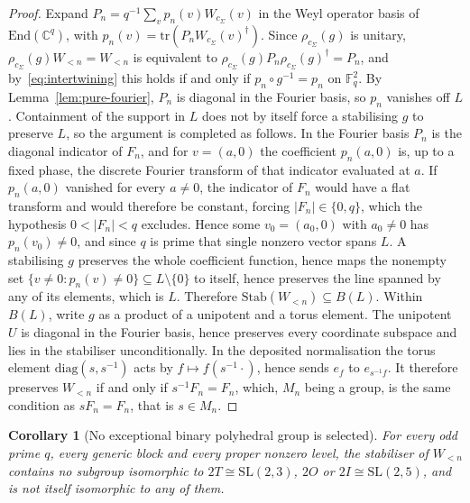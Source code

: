 \documentclass[11pt,a4paper]{article}
\newtheorem{corollary}[theorem]{Corollary}
\newcommand{\SL}{\mathrm{SL}}
\begin{document}
    \begin{proof}
      Expand $P_{n} = q^{-1} \sum_{v} p_{n}(v) W_{c_{\Sigma}}(v)$ in the Weyl operator basis of
      $\mathrm{End}(\mathbb{C}^{q})$, with
      $p_{n}(v) = \mathrm{tr}(P_{n} W_{c_{\Sigma}}(v)^{\dagger})$.
      Since $\rho_{c_{\Sigma}}(g)$ is unitary, $\rho_{c_{\Sigma}}(g) W_{<n} = W_{<n}$ is
      equivalent to
      $\rho_{c_{\Sigma}}(g) P_{n} \rho_{c_{\Sigma}}(g)^{\dagger} = P_{n}$, and
      by~\eqref{eq:intertwining} this holds if and only if $p_{n} \circ g^{-1} = p_{n}$ on
      $\mathbb{F}_{q}^{2}$.
      By Lemma~\ref{lem:pure-fourier}, $P_{n}$ is diagonal in the Fourier basis, so $p_{n}$
      vanishes off $L$.
      Containment of the support in $L$ does not by itself force a stabilising $g$ to preserve
      $L$, so the argument is completed as follows.
      In the Fourier basis $P_{n}$ is the diagonal indicator of $F_{n}$, and for $v = (a,0)$ the
      coefficient $p_{n}(a,0)$ is, up to a fixed phase, the discrete Fourier transform of that
      indicator evaluated at $a$.
      If $p_{n}(a,0)$ vanished for every $a \neq 0$, the indicator of $F_{n}$ would have a flat
      transform and would therefore be constant, forcing $|F_{n}| \in \{0, q\}$, which the
      hypothesis $0 < |F_{n}| < q$ excludes.
      Hence some $v_{0} = (a_{0},0)$ with $a_{0} \neq 0$ has $p_{n}(v_{0}) \neq 0$, and since
      $q$ is prime that single nonzero vector spans $L$.
      A stabilising $g$ preserves the whole coefficient function, hence maps the nonempty set
      $\{v \neq 0 : p_{n}(v) \neq 0\} \subseteq L \setminus \{0\}$ to itself, hence preserves
      the line spanned by any of its elements, which is $L$.
      Therefore $\mathrm{Stab}(W_{<n}) \subseteq B(L)$.
      Within $B(L)$, write $g$ as a product of a unipotent and a torus element.
      The unipotent $U$ is diagonal in the Fourier basis, hence preserves every coordinate
      subspace and lies in the stabiliser unconditionally.
      In the deposited normalisation the torus element $\mathrm{diag}(s, s^{-1})$ acts by
      $f \mapsto f(s^{-1} \cdot)$, hence sends $e_{f}$ to $e_{s^{-1} f}$.
      It therefore preserves $W_{<n}$ if and only if $s^{-1} F_{n} = F_{n}$, which, $M_{n}$
      being a group, is the same condition as $s F_{n} = F_{n}$, that is $s \in M_{n}$.
    \end{proof}

    \begin{corollary}[No exceptional binary polyhedral group is selected]
      \label{cor:no-binary-polyhedral}
      For every odd prime $q$, every generic block and every proper nonzero level, the
      stabiliser of $W_{<n}$ contains no subgroup isomorphic to $2T \cong \SL(2,3)$,
      $2O$ or $2I \cong \SL(2,5)$, and is not itself isomorphic to any of them.
    \end{corollary}
\end{document}
